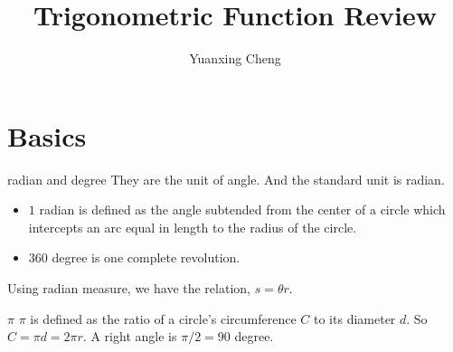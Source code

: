 \documentclass{article}
\title{Trigonometric Function Review}
\author{Yuanxing Cheng}
\begin{document}
\maketitle

\section{Basics}
\begin{myleftlinebox}
    radian and degree
    \tcblower
    They are the unit of angle. And the standard unit is radian.
    \begin{itemize}
        \item $1$ radian is defined as the angle subtended from the center of a circle which intercepts an arc equal in length to the radius of the circle. 
        \item $360$ degree is one complete revolution.
    \end{itemize}
    Using radian measure, we have the relation, $s=\theta r$.
	\begin{center}
	\end{center}
\end{myleftlinebox}

\begin{myleftlinebox}
	$\pi$
	\tcblower
	$\pi$ is defined as the ratio of a circle's circumference $C$ to its diameter $d$. So $C=\pi d=2\pi r$. A right angle is $\pi/2=90$ degree.
\end{myleftlinebox}
\end{document}
